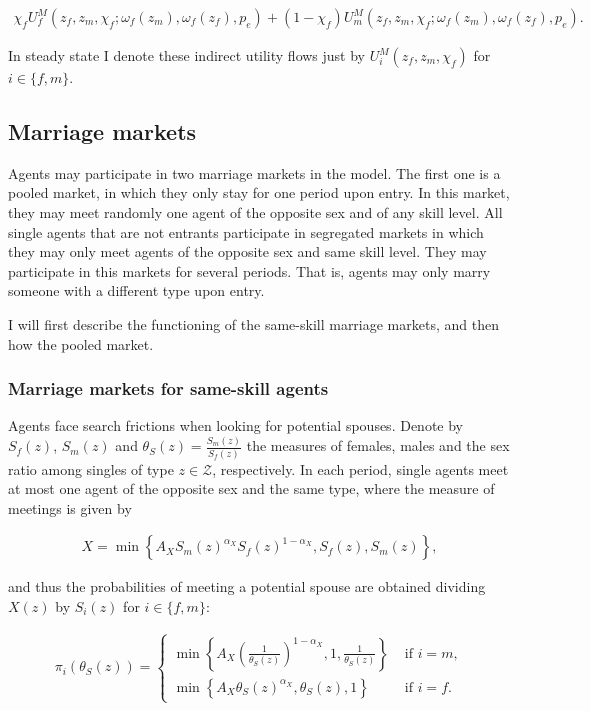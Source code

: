 \documentclass[12pt]{article}
\begin{document}
\begin{align*}
	\chi_f U_f^M\left(z_f,z_m,\chi_f;\omega_f(z_m),\omega_f(z_f),p_e\right)+\left(1-\chi_f\right) U_m^M\left(z_f,z_m,\chi_f;\omega_f(z_m),\omega_f(z_f),p_e\right).
\end{align*}

In steady state I denote these indirect utility flows just by $U_i^M\left(z_f,z_m,\chi_f\right)$ for $i\in\{f,m\}$.

\subsection{Marriage markets}

Agents may participate in two marriage markets in the model. The first one is a pooled market, in which they only stay for one period upon entry. In this market, they may meet randomly one agent of the opposite sex and of any skill level. All single agents that are not entrants participate in segregated markets in which they may only meet agents of the opposite sex and same skill level. They may participate in this markets for several periods. That is, agents may only marry someone with a different type upon entry.  

I will first describe the functioning of the same-skill marriage markets, and then how the pooled market.

\subsubsection{Marriage markets for same-skill agents}

Agents face search frictions when looking for potential spouses. Denote by $S_f(z)$, $S_m(z)$ and $\theta_{S}(z) = \frac{S_m(z)}{S_f(z)}$ the measures of females, males and the sex ratio among singles of type $z\in\mathcal{Z}$, respectively. In each period, single agents meet at most one agent of the opposite sex and the same type, where the measure of meetings is given by

\begin{align*}
X = \min \left\lbrace A_X S_m(z)^{\alpha_X} S_f(z)^{1-\alpha_X},S_f(z),S_m(z) \right\rbrace,
\end{align*}

and thus the probabilities of meeting a potential spouse are obtained dividing $X(z)$ by $S_i(z)$ for $i\in\{f,m\}$:

\begin{align*}
\pi_{i}\left(\theta_{S}(z)\right) = \begin{cases}
\min \left\lbrace A_X\left(\frac{1}{\theta_{S}(z)}\right)^{1-\alpha_X},1, \frac{1}{\theta_{S}(z)} \right\rbrace & \text{ if } i=m, \\
\min \left\lbrace A_X\theta_{S}(z)^{\alpha_X}, \theta_{S}(z),  1 \right\rbrace & \text{ if } i=f.
\end{cases}
\end{align*}
\end{document}
